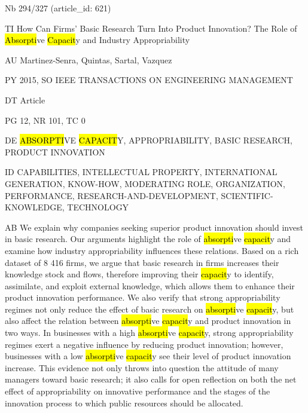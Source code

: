 \documentclass[a4paper]{article}
\begin{document}
\vspace*{-2cm}
Nb \tabto{0cm}294/327 (article\_id: 621)\par
TI \tabto{0cm}How Can Firms' Basic Research Turn Into Product Innovation? The Role of \hl{Absorpti}ve \hl{Capacit}y and Industry Appropriability\par
AU \tabto{0cm}Martinez-Senra, Quintas, Sartal, Vazquez\par
PY \tabto{0cm}2015, SO IEEE TRANSACTIONS ON ENGINEERING MANAGEMENT\par
DT \tabto{0cm}Article\par
PG \tabto{0cm}12, NR 101, TC 0\par
DE \tabto{0cm}\hl{ABSORPTI}VE \hl{CAPACIT}Y, APPROPRIABILITY, BASIC RESEARCH, PRODUCT INNOVATION\par
ID \tabto{0cm}CAPABILITIES, INTELLECTUAL PROPERTY, INTERNATIONAL GENERATION, KNOW-HOW, MODERATING ROLE, ORGANIZATION, PERFORMANCE, RESEARCH-AND-DEVELOPMENT, SCIENTIFIC-KNOWLEDGE, TECHNOLOGY\par
AB \tabto{0cm}We explain why companies seeking superior product innovation should invest in basic research. Our arguments highlight the role of \hl{absorpti}ve \hl{capacit}y and examine how industry appropriability influences these relations. Based on a rich dataset of 8 416 firms, we argue that basic research in firms increases their knowledge stock and flows, therefore improving their \hl{capacit}y to identify, assimilate, and exploit external knowledge, which allows them to enhance their product innovation performance. We also verify that strong appropriability regimes not only reduce the effect of basic research on \hl{absorpti}ve \hl{capacit}y, but also affect the relation between \hl{absorpti}ve \hl{capacit}y and product innovation in two ways. In businesses with a high \hl{absorpti}ve \hl{capacit}y, strong appropriability regimes exert a negative influence by reducing product innovation; however, businesses with a low \hl{absorpti}ve \hl{capacit}y see their level of product innovation increase. This evidence not only throws into question the attitude of many managers toward basic research; it also calls for open reflection on both the net effect of appropriability on innovative performance and the stages of the innovation process to which public resources should be allocated.\par
\clearpage
\end{document}
